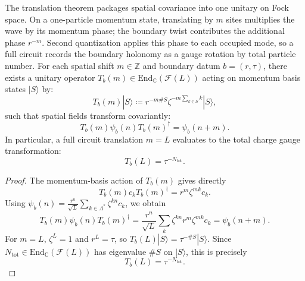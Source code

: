 \begin{theorem}
\label{thm:twisted_transport}
The translation theorem packages spatial covariance into one unitary on Fock space. On a one-particle momentum state, translating by $m$ sites multiplies the wave by its momentum phase; the boundary twist contributes the additional phase $r^{-m}$. Second quantization applies this phase to each occupied mode, so a full circuit records the boundary holonomy as a gauge rotation by total particle number.
For each spatial shift $m \in \mathbb{Z}$ and boundary datum $b = (r, \tau)$, there exists a unitary operator $T_b(m) \in \mathrm{End}_{\mathbb{C}}(\mathcal{F}(L))$ acting on momentum basis states $|S\rangle$ by:
\begin{equation}
T_b(m) |S\rangle \coloneqq r^{-m \#S} \zeta^{-m \sum_{k \in S} k} |S\rangle,
\end{equation}
such that spatial fields transform covariantly:
\begin{equation}
T_b(m) \psi_b(n) T_b(m)^\dagger = \psi_b(n + m).
\end{equation}
In particular, a full circuit translation $m = L$ evaluates to the total charge gauge transformation:
\begin{equation}
T_b(L) = \tau^{-N_{\mathrm{tot}}}.
\end{equation}
\end{theorem}

\begin{proof}
The momentum-basis action of $T_b(m)$ gives directly
\begin{equation}
T_b(m)c_kT_b(m)^\dagger=r^m\zeta^{mk}c_k.
\end{equation}
Using $\psi_b(n)=\frac{r^n}{\sqrt L}\sum_{k\in\Lambda^*}\zeta^{kn}c_k$, we obtain
\begin{equation}
T_b(m)\psi_b(n)T_b(m)^\dagger=\frac{r^n}{\sqrt L}\sum_k\zeta^{kn}r^m\zeta^{mk}c_k=\psi_b(n+m).
\end{equation}
For $m=L$, $\zeta^L=1$ and $r^L=\tau$, so $T_b(L)|S\rangle=\tau^{-\#S}|S\rangle$. Since $N_{\mathrm{tot}}\in\mathrm{End}_{\mathbb C}(\mathcal F(L))$ has eigenvalue $\#S$ on $|S\rangle$, this is precisely
\begin{equation}
T_b(L)=\tau^{-N_{\mathrm{tot}}}.
\end{equation}
\end{proof}

